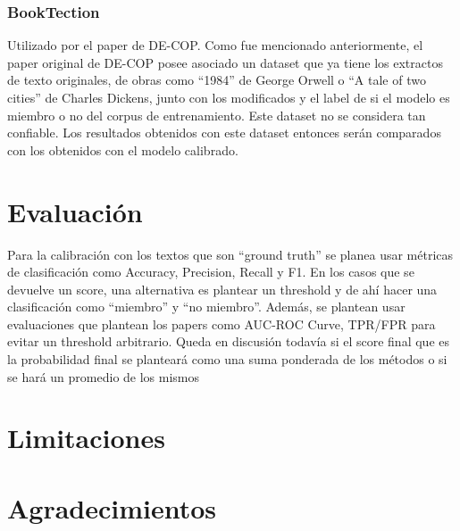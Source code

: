 \documentclass[11pt]{article}
\begin{document}
\subsubsection{BookTection}
Utilizado por el paper de DE-COP. Como fue mencionado anteriormente, el paper original de DE-COP posee asociado un dataset que ya tiene los extractos de texto originales, de obras como “1984” de George Orwell o “A tale of two cities” de Charles Dickens, junto con los modificados y el label de si el modelo es miembro o no del corpus de entrenamiento. Este dataset no se considera tan confiable. Los resultados obtenidos con este dataset entonces serán comparados con los obtenidos con el modelo calibrado. 


\section{Evaluación}
Para la calibración con los textos que son “ground truth” se planea usar métricas de clasificación como Accuracy, Precision, Recall y F1. En los casos que se devuelve un score, una alternativa es plantear un threshold y de ahí hacer una clasificación como “miembro” y “no miembro”. Además, se plantean usar evaluaciones que plantean los papers como AUC-ROC Curve, TPR/FPR para evitar un threshold arbitrario. 
Queda en discusión todavía si el score final que es la probabilidad final se planteará como una suma ponderada de los métodos o si se hará un promedio de los mismos

\section*{Limitaciones}

\section*{Agradecimientos}


\end{document}
